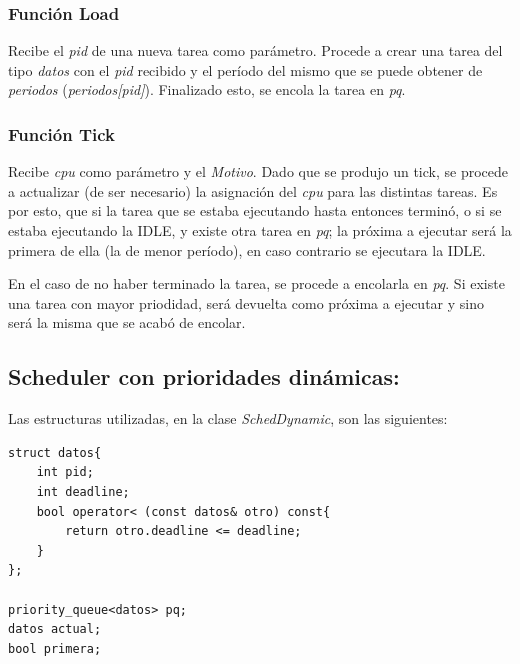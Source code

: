 \documentclass[a4paper]{article}
\begin{document}
\subsubsection*{Funci\'on Load}

Recibe el \emph{pid} de una nueva tarea como par\'ametro. Procede a crear una tarea del tipo \emph{datos} con el \emph{pid} recibido y el per\'iodo del mismo que se puede obtener de \emph{periodos} (\emph{periodos[pid]}). Finalizado esto, se encola la tarea en \emph{pq}.

\subsubsection*{Funci\'on Tick}	

Recibe \emph{cpu} como par\'ametro y el \emph{Motivo}. Dado que se produjo un tick, se procede a actualizar (de ser necesario) la asignación del \emph{cpu} para las distintas tareas.  Es por esto, que si la tarea que se estaba ejecutando hasta entonces terminó, o si se estaba ejecutando la IDLE, y existe otra tarea en \emph{pq}; la próxima a ejecutar será la primera de ella (la de menor período), en caso contrario se ejecutara la IDLE. 

En el caso de no haber terminado la tarea, se procede a encolarla en \emph{pq}. Si existe una tarea con mayor priodidad, ser\'a devuelta como próxima a ejecutar y sino ser\'a la misma que se acab\'o de encolar. \\ 


 
\bigskip 

\subsection*{Scheduler con prioridades dinámicas:}

Las estructuras utilizadas, en la clase \emph{SchedDynamic}, son las siguientes:
	\begin{codesnippet}
	\begin{verbatim}
struct datos{
    int pid;
    int deadline;
    bool operator< (const datos& otro) const{
        return otro.deadline <= deadline; 
    }
};

priority_queue<datos> pq;
datos actual;
bool primera;
	\end{verbatim}
	\end{codesnippet}
	
\end{document}
